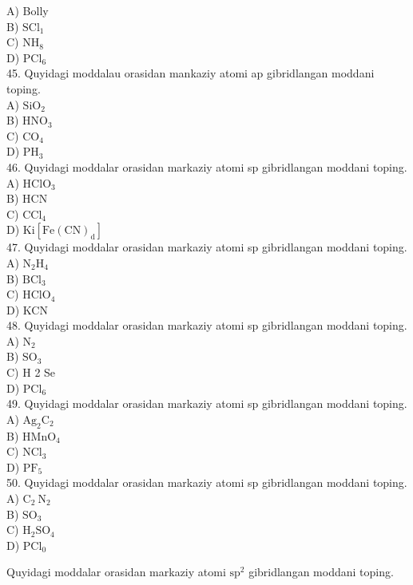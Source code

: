A) Bolly\\
B) $\mathrm{SCl}_{1}$\\
C) $\mathrm{NH}_{8}$\\
D) $\mathrm{PCl}_{6}$\\
45. Quyidagi moddalau orasidan mankaziy atomi ap gibridlangan moddani toping.\\
A) $\mathrm{SiO}_{2}$\\
B) $\mathrm{HNO}_{3}$\\
C) $\mathrm{CO}_{4}$\\
D) $\mathrm{PH}_{3}$\\
46. Quyidagi moddalar orasidan markaziy atomi sp gibridlangan moddani toping.\\
A) $\mathrm{HClO}_{3}$\\
B) HCN\\
C) $\mathrm{CCl}_{4}$\\
D) $\mathrm{Ki}\left[\mathrm{Fe}(\mathrm{CN})_{\mathrm{d}}\right]$\\
47. Quyidagi moddalar orasidan markaziy atomi sp gibridlangan moddani toping.\\
A) $\mathrm{N}_{2} \mathrm{H}_{4}$\\
B) $\mathrm{BCl}_{3}$\\
C) $\mathrm{HClO}_{4}$\\
D) KCN\\
48. Quyidagi moddalar orasidan markaziy atomi sp gibridlangan moddani toping.\\
A) $\mathrm{N}_{2}$\\
B) $\mathrm{SO}_{3}$\\
C) H 2 Se\\
D) $\mathrm{PCl}_{6}$\\
49. Quyidagi moddalar orasidan markaziy atomi sp gibridlangan moddani toping.\\
A) $\mathrm{Ag}_{2} \mathrm{C}_{2}$\\
B) $\mathrm{HMnO}_{4}$\\
C) $\mathrm{NCl}_{3}$\\
D) $\mathrm{PF}_{5}$\\
50. Quyidagi moddalar orasidan markaziy atomi sp gibridlangan moddani toping.\\
A) $\mathrm{C}_{2} \mathrm{~N}_{2}$\\
B) $\mathrm{SO}_{3}$\\
C) $\mathrm{H}_{2} \mathrm{SO}_{4}$\\
D) $\mathrm{PCl}_{0}$
  \item Quyidagi moddalar orasidan markaziy atomi $\mathrm{sp}^{2}$ gibridlangan moddani toping.\\
